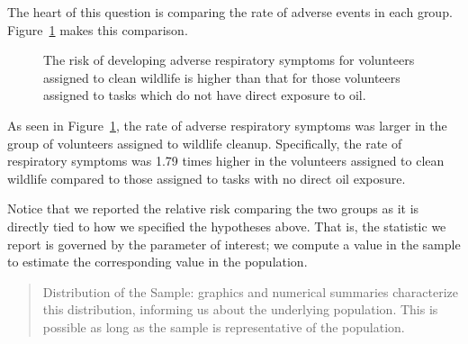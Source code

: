 \documentclass[
  letterpaper,
  DIV=11,
  numbers=noendperiod]{scrreprt}
\theoremstyle{definition}
\theoremstyle{definition}
\theoremstyle{plain}
\theoremstyle{remark}
\begin{document}
The heart of this question is comparing the rate of adverse events in
each group. Figure~\ref{fig-recaplanguage-deepwater-plot} makes this
comparison.

\begin{figure}


\caption{\label{fig-recaplanguage-deepwater-plot}The risk of developing
adverse respiratory symptoms for volunteers assigned to clean wildlife
is higher than that for those volunteers assigned to tasks which do not
have direct exposure to oil.}

\end{figure}%

As seen in Figure~\ref{fig-recaplanguage-deepwater-plot}, the rate of
adverse respiratory symptoms was larger in the group of volunteers
assigned to wildlife cleanup. Specifically, the rate of respiratory
symptoms was 1.79 times higher in the volunteers assigned to clean
wildlife compared to those assigned to tasks with no direct oil
exposure.

Notice that we reported the relative risk comparing the two groups as it
is directly tied to how we specified the hypotheses above. That is, the
statistic we report is governed by the parameter of interest; we compute
a value in the sample to estimate the corresponding value in the
population.

\begin{quote}
Distribution of the Sample: graphics and numerical summaries
characterize this distribution, informing us about the underlying
population. This is possible as long as the sample is representative of
the population.
\end{quote}
\end{document}
